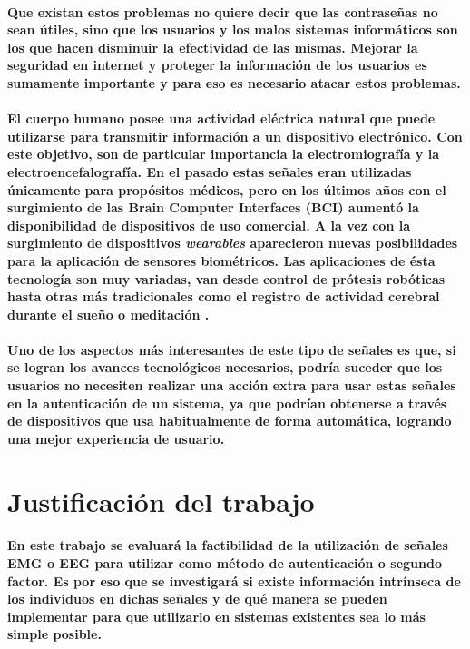 \documentclass{article}
\begin{document}
\paragraph{
Que existan estos problemas no quiere decir que las contraseñas no sean útiles, sino que los usuarios y los malos sistemas informáticos son los que hacen disminuir la efectividad de las mismas. Mejorar la seguridad en internet y proteger la información de los usuarios es sumamente
importante y para eso es necesario atacar estos problemas.
}
\paragraph{
El cuerpo humano posee una actividad eléctrica natural que puede utilizarse para transmitir información a un dispositivo electrónico. Con este objetivo, son de particular importancia la electromiografía y la electroencefalografía. En el pasado estas señales eran utilizadas únicamente para propósitos médicos, pero en los últimos años con el surgimiento de las Brain Computer Interfaces (BCI) aumentó la disponibilidad de dispositivos de uso comercial. A la vez con la surgimiento de dispositivos \textit{wearables} aparecieron nuevas posibilidades para la aplicación de sensores biométricos. Las aplicaciones de ésta tecnología son muy variadas, van desde control de prótesis robóticas \cite{veer2015} hasta otras más tradicionales como el registro de actividad cerebral durante el sueño o meditación \cite{kaur2015}.
}
\paragraph{
Uno de los aspectos más interesantes de este tipo de señales es que, si se logran los avances tecnológicos necesarios, podría suceder que los usuarios no necesiten realizar una acción extra para usar estas señales en la autenticación de un sistema, ya que podrían obtenerse a través de dispositivos que usa habitualmente de forma automática, logrando una mejor experiencia de usuario.
}
\section{Justificación del trabajo}
\paragraph{
En este trabajo se evaluará la factibilidad de la utilización de señales EMG o EEG para utilizar como método de autenticación o segundo factor. Es por eso que se investigará si existe información intrínseca de los individuos en dichas señales y de qué manera se pueden implementar para que utilizarlo en sistemas existentes sea lo más simple posible.
}
\end{document}
